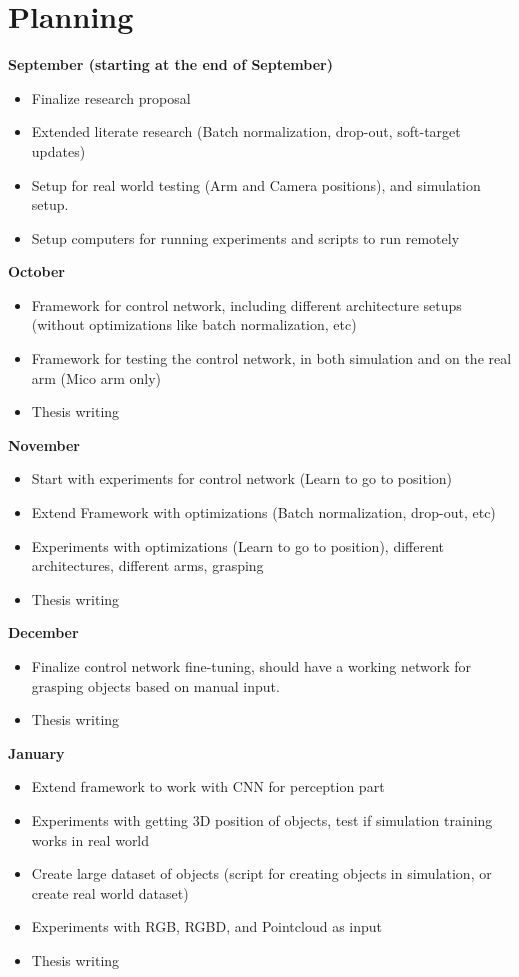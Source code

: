 \section{Planning}

\textbf{September (starting at the end of September)}
\begin{itemize}
  \item Finalize research proposal
  \item Extended literate research (Batch normalization, drop-out, soft-target updates)
  \item Setup for real world testing (Arm and Camera positions), and simulation setup.
  \item Setup computers for running experiments and scripts to run remotely  
\end{itemize} 
\textbf{October}
\begin{itemize}
  \item Framework for control network, including different architecture setups (without optimizations like batch normalization, etc)
  \item Framework for testing the control network, in both simulation and on the real arm (Mico arm only)  
  \item Thesis writing
\end{itemize}
\textbf{November}
\begin{itemize}
  \item Start with experiments for control network (Learn to go to position)
  \item Extend Framework with optimizations (Batch normalization, drop-out, etc)
  \item Experiments with optimizations (Learn to go to position), different architectures, different arms, grasping
  \item Thesis writing
\end{itemize}
\textbf{December}
\begin{itemize}
  \item Finalize control network fine-tuning, should have a working network for grasping objects based on manual input.
  \item Thesis writing
\end{itemize}
\textbf{January}
\begin{itemize}
  \item Extend framework to work with CNN for perception part
  \item Experiments with getting 3D position of objects, test if simulation training works in real world
  \item Create large dataset of objects (script for creating objects in simulation, or create real world dataset)
  \item Experiments with RGB, RGBD, and Pointcloud as input
  \item Thesis writing
\end{itemize}
